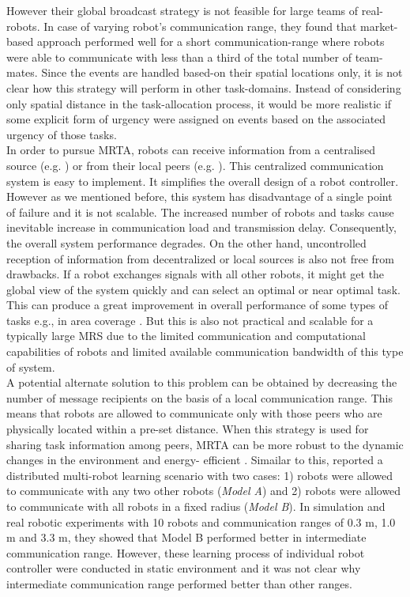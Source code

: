However their global broadcast strategy is not feasible for large teams of real-robots. In case of varying robot's communication range,  they found that market-based approach performed well for a short communication-range where robots were able to communicate with less than a third of the total number of team-mates. Since the events are handled based-on their spatial locations only, it is not clear how this strategy  will perform in other task-domains. Instead of considering only spatial distance in the task-allocation process, it would be more realistic if some explicit form of urgency were assigned on events  based on the associated urgency of those tasks.\\
In order to pursue MRTA, robots can receive information from a centralised source (e.g. ) or from their local peers (e.g. ). This centralized communication system is easy to implement. It simplifies the overall design of a robot controller. However as we mentioned before, this system has disadvantage of a single point of failure and it is not scalable. The increased number of robots and tasks cause inevitable increase in communication load and transmission delay. Consequently, the overall system performance degrades. On the other hand, uncontrolled reception of information from decentralized or local sources is also not free from drawbacks. If a robot exchanges signals with all other robots, it might get the global view of the system quickly and can select an optimal or near optimal task. This can produce a great improvement in overall performance of some types of tasks e.g., in area coverage \cite{Rutishauser}. But this is also not practical and scalable for a typically large MRS due to the limited communication and computational capabilities of robots and limited available communication bandwidth of this type of system.\\
A potential alternate solution to this problem can be obtained by decreasing the number of message recipients on the basis of a local communication range. This means that robots are allowed to communicate only with those peers who are physically located within a pre-set distance. When this strategy is used for sharing task information among peers, MRTA can be more robust to the dynamic changes in the environment and energy- efficient \cite{Agassounon}. Simailar to this,  reported a distributed multi-robot learning scenario with two cases: 1) robots were allowed to communicate with any two other robots ({\em Model A}) and 2)  robots were allowed to communicate with all robots in a fixed radius ({\em Model B}). In simulation and real robotic experiments with 10 robots and communication ranges of 0.3 m, 1.0 m and 3.3 m, they showed that Model B performed better in intermediate communication range. However, these learning process of individual robot controller were  conducted  in static environment and it was not clear why intermediate communication range performed better than other ranges. \\
